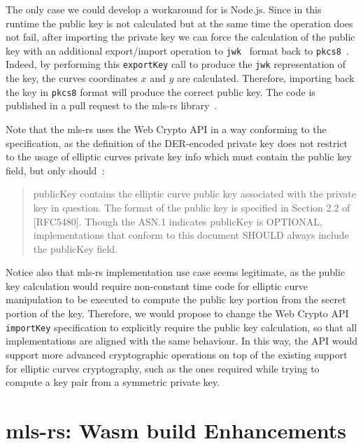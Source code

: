 The only case we could develop a workaround for is Node.js. Since in this runtime
the public key is not calculated but at the same time the operation does not fail,
after importing the private key we can force the calculation of the public key with an additional
export/import operation to \texttt{jwk}~\cite{JsonWebKey} format back to \texttt{pkcs8}~\cite{rfc5958}.
Indeed, by performing this \texttt{exportKey} call to produce the \texttt{jwk}
representation of the key, the curves coordinates $x$ and $y$ are calculated.
Therefore, importing back the key in \texttt{pkcs8} format will produce the correct
public key. The code is published in a pull request to the mls-rs library~\cite{AWSNodeJSCodeContributions}.

Note that the mls-rs uses the Web Crypto API in a way conforming to the
specification, as the definition of the DER-encoded private key does not
restrict to the usage of elliptic curves private key info which must 
contain the public key field, but only should~\cite{rfc5915}:
\begin{quote}
    publicKey contains the elliptic curve public key associated with
    the private key in question.  The format of the public key is
    specified in Section 2.2 of [RFC5480].  Though the ASN.1 indicates
    publicKey is OPTIONAL, implementations that conform to this
    document SHOULD always include the publicKey field.
\end{quote}

Notice also that mls-rs implementation use case seems legitimate,
as the public key calculation would require non-constant time code for elliptic curve manipulation
to be executed to compute the public key portion from the secret portion of the key. 
Therefore, we would propose
to change the Web Crypto API \texttt{importKey} specification to
explicitly require the public key calculation, so that all
implementations are aligned with the same behaviour. In this way,
the API would support more advanced cryptographic operations on top
of the existing support for elliptic curves cryptography, such as the ones
required while trying to compute a key pair from a symmetric private key.

\section{mls-rs: Wasm build Enhancements}\label{sc:MLS-enhancements}

